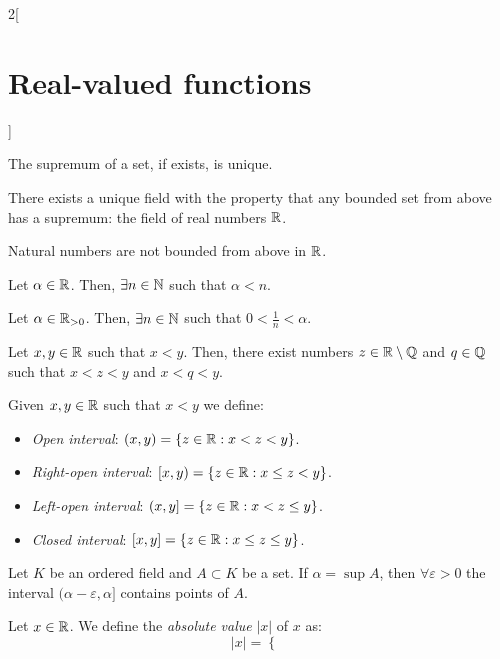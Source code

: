 \documentclass[../../../main.tex]{subfiles}
\begin{document}
\begin{multicols}{2}[\section{Real-valued functions}]
\begin{proposition}
  \end{proposition}
  \begin{proposition}
    The supremum of a set, if exists, is unique.
  \end{proposition}
  \begin{theorem}
    There exists a unique field with the property that any bounded set from above has a supremum: the field of real numbers $\mathbb{R}$.
  \end{theorem}
  \begin{proposition}
    Natural numbers are not bounded from above in $\mathbb{R}$.
  \end{proposition}
  \begin{corollary}
    Let $\alpha\in\mathbb{R}$. Then, $\exists n\in\mathbb{N}$ such that $\alpha<n$.
  \end{corollary}
  \begin{corollary}
    Let $\alpha\in\mathbb{R}_{>0}$. Then, $\exists n\in\mathbb{N}$ such that $0<\frac{1}{n}<\alpha$.
  \end{corollary}
  \begin{proposition}
    Let $x,y\in\mathbb{R}$ such that $x<y$. Then, there exist numbers $z\in\mathbb{R}\setminus\mathbb{Q}$ and $q\in\mathbb{Q}$ such that $x<z<y$ and $x<q<y$.
  \end{proposition}
  \begin{definition}
    Given $x,y\in\mathbb{R}$ such that $x<y$ we define:
    \begin{itemize}
      \item \emph{Open interval}: $(x,y)=\{z\in\mathbb{R}:x<z<y\}$.
      \item \emph{Right-open interval}: $[x,y)=\{z\in\mathbb{R}:x\leq z<y\}$.
      \item \emph{Left-open interval}: $(x,y]=\{z\in\mathbb{R}:x<z\leq y\}$.
      \item \emph{Closed interval}: $[x,y]=\{z\in\mathbb{R}:x\leq z\leq y\}$.
    \end{itemize}
  \end{definition}
  \begin{lemma}
    Let $K$ be an ordered field and $A\subset K$ be a set. If $\alpha=\sup A$, then $\forall \varepsilon>0$ the interval $(\alpha-\varepsilon,\alpha]$ contains points of $A$.
  \end{lemma}
  \begin{definition}
    Let $x\in\mathbb{R}$. We define the \emph{absolute value} $|x|$ of $x$ as:
    \begin{equation*}
      |x|=\begin{cases}

\end{cases}
\end{equation*}
\end{definition}
\end{multicols}
\end{document}
